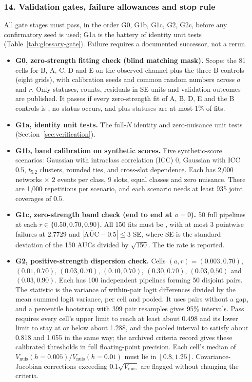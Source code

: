 \subsubsection*{14. Validation gates, failure allowances and stop rule}
All gate stages must pass, in the order G0, G1b, G1c, G2, G2c, before any confirmatory seed is used; G1a is the battery of identity unit tests (Table~\ref{tab:glossary-gate}). Failure requires a documented successor, not a rerun.
\begin{itemize}
\item \textbf{G0, zero-strength fitting check (blind matching mask).} Scope: the 81 cells for B, A, C, D and E on the observed channel plus the three B controls (eight grids), with calibration seeds and common random numbers across $a$ and $r$. Only statuses, counts, residuals in SE units and validation outcomes are published. It passes if every zero-strength fit of A, B, D, E and the B controls is , no  status occurs, and  plus  statuses are at most 1\% of fits.
\item \textbf{G1a, identity unit tests.} The full-$N$ identity and zero-nuisance unit tests (Section~\ref{sec:verification}).
\item \textbf{G1b, band calibration on synthetic scores.} Five synthetic-score scenarios: Gaussian with intraclass correlation (ICC) 0, Gaussian with ICC 0.5, $t_{5.2}$ clusters, rounded ties, and cross-slot dependence. Each has 2,000 networks $\times$ 2 events per class, 9 slots, equal classes and zero nuisance. There are 1,000 repetitions per scenario, and each scenario needs at least 935 joint coverages of 0.5.
\item \textbf{G1c, zero-strength band check (end to end at $a=0$).} 50 full pipelines at each $r\in\{0.50,0.70,0.90\}$. All 150 fits must be , with at most 3 pointwise failures at 2.7729 and $|\overline{\mathrm{AUC}}-0.5|\le3$ SE, where SE is the standard deviation of the 150 AUCs divided by $\sqrt{150}$. The tie rate is reported.
\item \textbf{G2, positive-strength dispersion check.} Cells $(a,r)=(0.003,0.70)$, $(0.01,0.70)$, $(0.03,0.70)$, $(0.10,0.70)$, $(0.30,0.70)$, $(0.03,0.50)$ and $(0.03,0.90)$. Each has 100 independent pipelines forming 50 disjoint pairs. The statistic is the variance of within-pair logit differences divided by the mean summed logit variance, per cell and pooled. It uses pairs without a gap, and a percentile bootstrap with 399 pair resamples gives 95\% intervals. Pass requires every cell's upper limit to reach at least about 0.498 and its lower limit to stay at or below about 1.288, and the pooled interval to satisfy about 0.818 and 1.055 in the same way; the archived criteria record gives these calibrated thresholds in full floating-point precision. Each cell's median of $V_{\mathrm{nuis}}(h{=}0.005)/V_{\mathrm{nuis}}(h{=}0.01)$ must lie in $[0.8,1.25]$. Covariance-Jacobian corrections exceeding $0.1\sqrt{V_{\mathrm{nuis}}}$ are flagged without changing the criteria.

\end{itemize}

